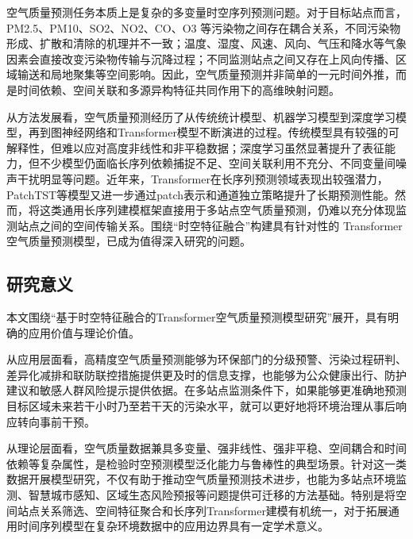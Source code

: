 空气质量预测任务本质上是复杂的多变量时空序列预测问题。对于目标站点而言，PM2.5、PM10、SO2、NO2、CO、O3 等污染物之间存在耦合关系，不同污染物形成、扩散和清除的机理并不一致；温度、湿度、风速、风向、气压和降水等气象因素会直接改变污染物传输与沉降过程；不同监测站点之间又存在上风向传播、区域输送和局地聚集等空间影响\cite{zheng_forecasting_2015,agbehadji_systematic_2024}。因此，空气质量预测并非简单的一元时间外推，而是时间依赖、空间关联和多源异构特征共同作用下的高维映射问题。

从方法发展看，空气质量预测经历了从传统统计模型、机器学习模型到深度学习模型，再到图神经网络和Transformer模型不断演进的过程\cite{agbehadji_systematic_2024,peinado_statistical_2025}。传统模型具有较强的可解释性，但难以应对高度非线性和非平稳数据；深度学习虽然显著提升了表征能力，但不少模型仍面临长序列依赖捕捉不足、空间关联利用不充分、不同变量间噪声干扰明显等问题。近年来，Transformer在长序列预测领域表现出较强潜力，PatchTST等模型又进一步通过patch表示和通道独立策略提升了长期预测性能\cite{vaswani_attention_2017,zhou_informer_2021,wu_autoformer_2021,zhou_fedformer_2022,nie_time_2023,zeng_are_2023,zhang_crossformer_2022,wu_timesnet_2022,lim_temporal_2021,wen_transformers_2023}。然而，将这类通用长序列建模框架直接用于多站点空气质量预测，仍难以充分体现监测站点之间的空间传输关系。围绕“时空特征融合”构建具有针对性的 Transformer空气质量预测模型，已成为值得深入研究的问题。

\subsection{研究意义}

本文围绕“基于时空特征融合的Transformer空气质量预测模型研究”展开，具有明确的应用价值与理论价值。

从应用层面看，高精度空气质量预测能够为环保部门的分级预警、污染过程研判、差异化减排和联防联控措施提供更及时的信息支撑，也能够为公众健康出行、防护建议和敏感人群风险提示提供依据\cite{world_health_organization_who_2021,_2024_2025,baklanov_integrated_2007,atkinson_urban_2010}。在多站点监测条件下，如果能够更准确地预测目标区域未来若干小时乃至若干天的污染水平，就可以更好地将环境治理从事后响应转向事前干预。

从理论层面看，空气质量数据兼具多变量、强非线性、强非平稳、空间耦合和时间依赖等复杂属性，是检验时空预测模型泛化能力与鲁棒性的典型场景。针对这一类数据开展模型研究，不仅有助于推动空气质量预测技术进步，也能为多站点环境监测、智慧城市感知、区域生态风险预报等问题提供可迁移的方法基础\cite{zheng_forecasting_2015,agbehadji_systematic_2024,peinado_statistical_2025}。特别是将空间站点关系筛选、空间特征聚合和长序列Transformer建模有机统一，对于拓展通用时间序列模型在复杂环境数据中的应用边界具有一定学术意义。

